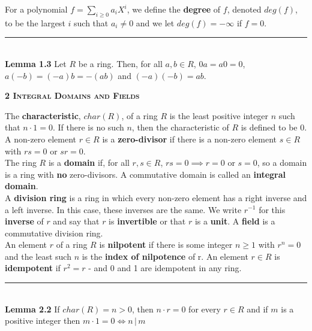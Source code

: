 \documentclass[a4paper]{article}
\begin{document}
\begin{framed}
	\noindent
	For a polynomial $f = \sum_{i \geq 0}a_iX^i$, we define the \textbf{degree} of $f$, denoted $deg(f)$, to be the largest $i$ such that $a_i \neq 0$ and we let $deg(f) = -\infty$ if $f = 0$.\\
	
	\noindent\rule{\textwidth}{0.5pt}\\
	
	\noindent
	\textbf{Lemma 1.3} Let $R$ be a ring. Then, for all $a, b \in R$, $0a = a0 = 0$, $a(-b) = (-a)b = -(ab)$ and $(-a)(-b) = ab$.
\end{framed}

\begin{framed}
	\begin{center}
		\textbf{\textsc{2 Integral Domains and Fields}}
	\end{center}
	The \textbf{characteristic}, $char(R)$, of a ring $R$ is the least positive integer $n$ such that $n \cdot 1 = 0$. If there is no such $n$, then the characteristic of $R$ is defined to be 0.\\
	
	\noindent
	A non-zero element $r \in R$ is a \textbf{zero-divisor} if there is a non-zero element $s \in R$ with $rs = 0$ or $sr = 0$.\\
	
	\noindent
	The ring $R$ is a \textbf{domain} if, for all $r, s \in R$, $rs = 0 \implies r = 0$ or $s = 0$, so a domain is a ring with \textbf{no} zero-divisors. A commutative domain is called an \textbf{integral domain}.\\
	
	\noindent
	A \textbf{division ring} is a ring in which every non-zero element has a right inverse and a left inverse. In this case, these inverses are the same. We write $r^{-1}$ for this \textbf{inverse} of $r$ and say that $r$ is \textbf{invertible} or that $r$ is a \textbf{unit}. A \textbf{field} is a commutative division ring.\\
	
	\noindent
	An element $r$ of a ring $R$ is \textbf{nilpotent} if there is some integer $n \geq 1$ with $r^n = 0$ and the least such $n$ is the \textbf{index of nilpotence} of r. An element $r \in R$ is \textbf{idempotent} if $r^2 = r$ - and 0 and 1 are idempotent in any ring.\\
	
	\noindent\rule{\textwidth}{0.5pt}\\
	
	\noindent
	\textbf{Lemma 2.2} If $char(R) = n > 0$, then
	$n \cdot r = 0$ for every $r \in R$ and if $m$ is a positive integer then $m \cdot 1 = 0 \iff n \, \vert \, m$\\
	

\end{framed}
\end{document}
